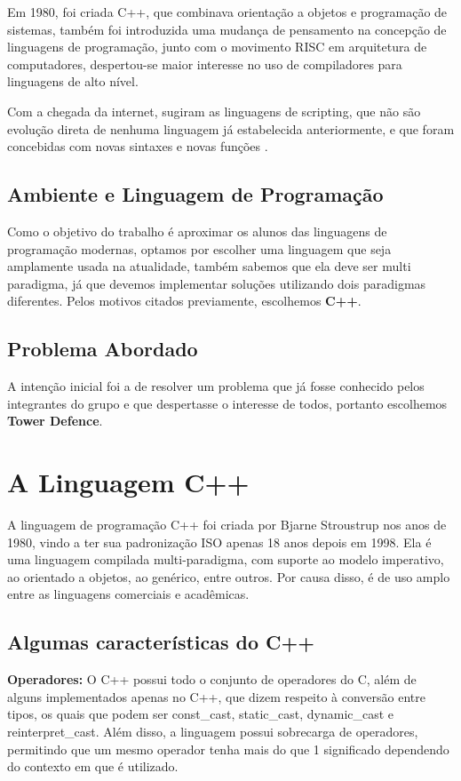 \documentclass[rel_mlp]{iiufrgs}
\begin{document}
Em 1980, foi criada C++, que combinava orientação a objetos e programação de sistemas, também foi introduzida uma mudança de pensamento na concepção de linguagens de programação, junto com o movimento RISC em arquitetura de computadores, despertou-se maior interesse no uso de compiladores para linguagens de alto nível.

Com a chegada da internet, sugiram as linguagens de scripting, que não são evolução direta de nenhuma linguagem já estabelecida anteriormente, e que foram concebidas com novas sintaxes e novas funções \cite{ceruzzi1998history}.

\section{Ambiente e Linguagem de Programação}
Como o objetivo do trabalho é aproximar os alunos das linguagens de programação modernas, optamos por escolher uma linguagem que seja amplamente usada na atualidade, também sabemos que ela deve ser multi paradigma, já que devemos implementar soluções utilizando dois paradigmas diferentes.
Pelos motivos citados previamente, escolhemos \textbf{C++}.

\section{Problema Abordado}
A intenção inicial foi a de resolver um problema que já fosse conhecido pelos integrantes do grupo e que despertasse o interesse de todos, portanto escolhemos \textbf {Tower Defence}.

\chapter{A Linguagem C++} \label{C++}

A linguagem de programação C++ foi criada por Bjarne Stroustrup nos anos de 1980, vindo a ter sua padronização ISO apenas 18 anos depois em 1998. Ela é uma linguagem compilada multi-paradigma, com suporte ao modelo imperativo, ao orientado a objetos, ao genérico, entre outros. Por causa disso, é de uso amplo entre as linguagens comerciais e acadêmicas.

\section{Algumas características do C++}

	\textbf{Operadores:} O C++ possui todo o conjunto de operadores do C, além de alguns implementados apenas no C++, que dizem respeito à conversão entre tipos, os quais que podem ser const\_cast, static\_cast, dynamic\_cast e reinterpret\_cast. Além disso, a linguagem possui sobrecarga de operadores, permitindo que um mesmo operador tenha mais do que 1 significado dependendo do contexto em que é utilizado.
\end{document}
